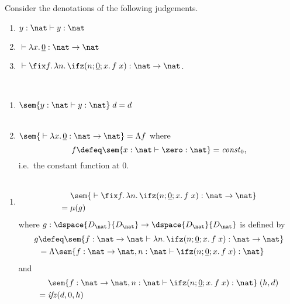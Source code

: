 \begin{frame}
  \begin{example}
  Consider the denotations of the following judgements. 
    \begin{enumerate}
      \item $y : \nat \vdash y : \nat$
      \item ${}\vdash \lambda x.\, \underline{0} : \nat \to \nat$
      \item ${}\vdash \fix f.\,\lambda n.\,\ifz(n; \underline{0}; x.\, f\; x) : \nat
          \to \nat$.
    \end{enumerate}
  \end{example}
  ~\\
  \begin{enumerate}
    \item $\sem{ y : \nat \vdash y : \nat }\;d = d$
      \\~\\
    \item $\sem{{}\vdash \lambda x.\,\underline{0} : \nat \to\nat} = \Lambda f$ where
      \[
        f \defeq \sem{ x : \nat \vdash \zero : \nat} = \mathit{const}_0,
      \] i.e.\ the constant function at $0$.  
      \\~\\
      \seti
 \end{enumerate}
\end{frame}

\begin{frame}
  \begin{enumerate}
      \conti
    \item
      \begin{align*}
            & \sem{ {}\vdash \fix f.\,\lambda n.\,\ifz(n; \underline{0}; x.\, f\; x) : \nat
          \to \nat} \\
        ={} & \mu(g)
      \end{align*}
        where $g : \dspace{D_\nat}{D_\nat} \to \dspace{D_\nat}{D_\nat}$ is defined by
        \begin{align*}
           g & \defeq \sem{f : \nat \to \nat \vdash \lambda
          n.\,\ifz(n;\underline{0}; x.\,f\;x) : \nat \to \nat} \\
            & = \Lambda \sem{f : \nat \to \nat, n : \nat \vdash \ifz(n;
          \underline{0}; x.\,f\;x) : \nat}
        \end{align*}
        and
        \begin{align*}
         & \sem{f: \nat \to \nat, n : \nat \vdash
           \ifz(n; \underline{0}; x.\, f\;x) : \nat}\; (h,d) \\
         ={} & \mathit{ifz}(d, 0, h) 
        \end{align*}
    \end{enumerate}
\end{frame}

